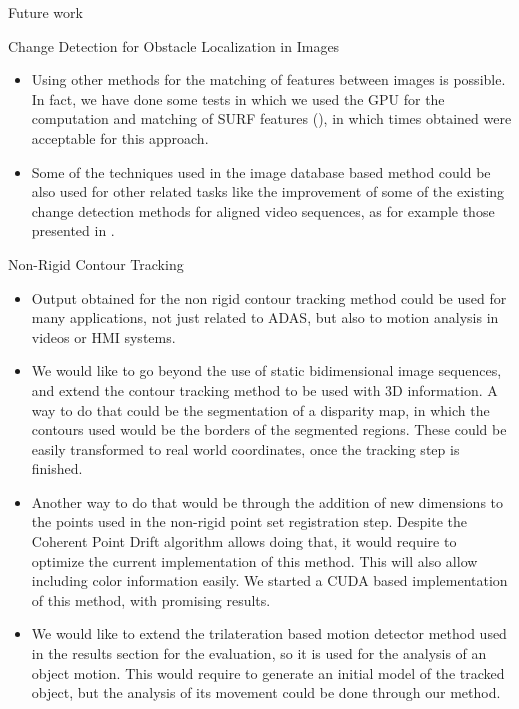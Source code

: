 \begin{frame}{Future work}
  \footnotesize
  \begin{itemize}
     {
    \tiny
    \item Change Detection for Obstacle Localization in Images
    \begin{itemize}
      \tiny
      \item Using other methods for the matching of features between images is possible. In fact, we have done some tests in which we used the GPU for the computation and matching of SURF features (\cite{bay2008speeded}), in which times obtained were acceptable for this approach.
      \item Some of the techniques used in the image database based method could be also used for other related tasks like the improvement of some of the existing change detection methods for aligned video sequences, as for example those presented in \cite{diego2011video, evangelidis2011slice, evangelidis2011efficient}.
    \end{itemize}
    \tiny
    \item Non-Rigid Contour Tracking
    \begin{itemize}
      \tiny
      \item Output obtained for the non rigid contour tracking method could be used for many applications, not just related to ADAS, but also to motion analysis in videos or HMI systems.
      \item We would like to go beyond the use of static bidimensional image sequences, and extend the contour tracking method to be used with 3D information. A way to do that could be the segmentation of a disparity map, in which the contours used would be the borders of the segmented regions. These could be easily transformed to real world coordinates, once the tracking step is finished.
      \item Another way to do that would be through the addition of new dimensions to the points used in the non-rigid point set registration step. Despite the Coherent Point Drift algorithm allows doing that, it would require to optimize the current implementation of this method. This will also allow including color information easily. We started a CUDA based implementation of this method, with promising results.
      \item We would like to extend the trilateration based motion detector method used in the results section for the evaluation, so it is used for the analysis of an object motion. This would require to generate an initial model of the tracked object, but the analysis of its movement could be done through our method.

\end{itemize}}
\end{itemize}
\end{frame}
